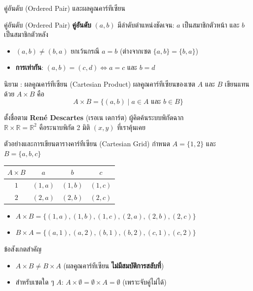 \begin{frame}{คู่อันดับ (Ordered Pair) และผลคูณคาร์ทีเซียน}
  \begin{block}{คู่อันดับ (Ordered Pair)}
    \textbf{คู่อันดับ} $(a, b)$ มีลำดับตำแหน่งชัดเจน: $a$ เป็นสมาชิกตัวหน้า และ $b$ เป็นสมาชิกตัวหลัง
    \begin{itemize}
      \item $(a, b) \neq (b, a)$ ยกเว้นกรณี $a = b$ (ต่างจากเซต $\{a, b\} = \{b, a\}$)
      \item \textbf{การเท่ากัน}: $(a, b) = (c, d) \iff a = c \text{ และ } b = d$
    \end{itemize}
  \end{block}
  \vspace{0.2em}
  \begin{block}{นิยาม : ผลคูณคาร์ทีเซียน (Cartesian Product)}
    ผลคูณคาร์ทีเซียนของเซต $A$ และ $B$ เขียนแทนด้วย $A \times B$ คือ
    \[ A \times B = \{(a, b) \mid a \in A \text{ และ } b \in B\} \]
  \end{block}
  \vspace{0.2em}
  \footnotesize ตั้งชื่อตาม \textbf{Ren\'e Descartes} (เรอเน เดการ์ต) ผู้คิดค้นระบบพิกัดฉาก \\
  $\mathbb{R} \times \mathbb{R} = \mathbb{R}^2$ คือระนาบพิกัด 2 มิติ $(x, y)$ ที่เราคุ้นเคย
\end{frame}

\begin{frame}{ตัวอย่างและการเขียนตารางคาร์ทีเซียน (Cartesian Grid)}
  กำหนด $A = \{1, 2\}$ และ $B = \{a, b, c\}$
  \begin{center}
  \renewcommand{\arraystretch}{1.2}
  \begin{tabular}{|c|c|c|c|}
    \hline
    $A \times B$ & $a$ & $b$ & $c$ \\ \hline
    $1$ & $(1,a)$ & $(1,b)$ & $(1,c)$ \\ \hline
    $2$ & $(2,a)$ & $(2,b)$ & $(2,c)$ \\ \hline
  \end{tabular}
  \end{center}
  \begin{itemize}\small
    \item $A \times B = \{(1,a), (1,b), (1,c), (2,a), (2,b), (2,c)\}$
    \item $B \times A = \{(a,1), (a,2), (b,1), (b,2), (c,1), (c,2)\}$
  \end{itemize}
  \vspace{0.1em}
  \begin{alertblock}{ข้อสังเกตสำคัญ}
    \begin{itemize}\small
      \item $A \times B \neq B \times A$ (ผลคูณคาร์ทีเซียน \textbf{ไม่มีสมบัติการสลับที่})
      \item สำหรับเซตใด ๆ $A$: \quad $A \times \emptyset = \emptyset \times A = \emptyset$ (เพราะจับคู่ไม่ได้)
    \end{itemize}
  \end{alertblock}
\end{frame}

